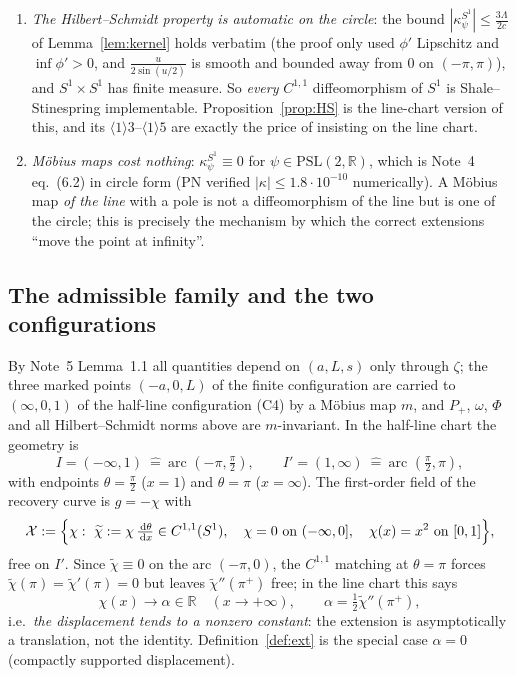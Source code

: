 \documentclass[11pt]{article}
\newcommand{\Pp}{P_+}\newcommand{\Pm}{P_-}
\begin{document}
\begin{enumerate}[label=(\roman*),leftmargin=2.2em]
\item \emph{The Hilbert--Schmidt property is automatic on the circle}: the bound
 $|\kappa^{S^1}_\psi|\le\frac{3\Lambda}{2c}$ of Lemma~\ref{lem:kernel} holds verbatim (the proof only
 used $\phi'$ Lipschitz and $\inf\phi'>0$, and $\frac{u}{2\sin(u/2)}$ is smooth and bounded away from
 $0$ on $(-\pi,\pi)$), and $S^1\times S^1$ has finite measure.  So \emph{every} $C^{1,1}$
 diffeomorphism of $S^1$ is Shale--Stinespring implementable.  Proposition~\ref{prop:HS} is the
 line-chart version of this, and its $\langle1\rangle3$--$\langle1\rangle5$ are exactly the price of
 insisting on the line chart.
\item \emph{M\"obius maps cost nothing}: $\kappa^{S^1}_\psi\equiv0$ for $\psi\in\mathrm{PSL}(2,\mathbb R)$,
 which is Note~4 eq.~(6.2) in circle form (PN verified $|\kappa|\le1.8\cdot10^{-10}$
 numerically).  A M\"obius map \emph{of the line} with a pole is not a diffeomorphism of the line but
 is one of the circle; this is precisely the mechanism by which the correct extensions ``move the
 point at infinity''.
\end{enumerate}

\subsection{The admissible family and the two configurations}
By Note~5 Lemma~1.1 all quantities depend on $(a,L,s)$ only through $\zeta$; the three marked points
$(-a,0,L)$ of the finite configuration are carried to $(\infty,0,1)$ of the half-line configuration
(C4) by a M\"obius map $m$, and $\Pp$, $\omega$, $\Phi$ and all Hilbert--Schmidt norms above are
$m$-invariant.  In the half-line chart the geometry is
\[
 I=(-\infty,1)\ \widehat=\ \text{arc }(-\pi,\tfrac\pi2),\qquad
 I'=(1,\infty)\ \widehat=\ \text{arc }(\tfrac\pi2,\pi),
\]
with endpoints $\theta=\frac\pi2$ ($x=1$) and $\theta=\pi$ ($x=\infty$).  The first-order field of the
recovery curve is $g=-\chi$ with
\begin{equation}\label{eq:class}
 \mathcal X:=\Bigl\{\chi:\ \widetilde\chi:=\chi\,\tfrac{\,\mathrm d\theta}{\,\mathrm d x}\in C^{1,1}(S^1),\quad
 \chi=0\ \text{on }(-\infty,0],\quad \chi(x)=x^2\ \text{on }[0,1]\Bigr\},
\end{equation}
free on $I'$.  Since $\widetilde\chi\equiv0$ on the arc $(-\pi,0)$, the $C^{1,1}$ matching at
$\theta=\pi$ forces $\widetilde\chi(\pi)=\widetilde\chi'(\pi)=0$ but leaves
$\widetilde\chi''(\pi^+)$ free; in the line chart this says
\begin{equation}\label{eq:alpha}
 \chi(x)\longrightarrow\alpha\in\mathbb R\quad(x\to+\infty),\qquad
 \alpha=\tfrac12\widetilde\chi''(\pi^+),
\end{equation}
i.e.\ \emph{the displacement tends to a nonzero constant}: the extension is asymptotically a
translation, not the identity.  Definition~\ref{def:ext} is the special case $\alpha=0$ (compactly
supported displacement).
\end{document}
